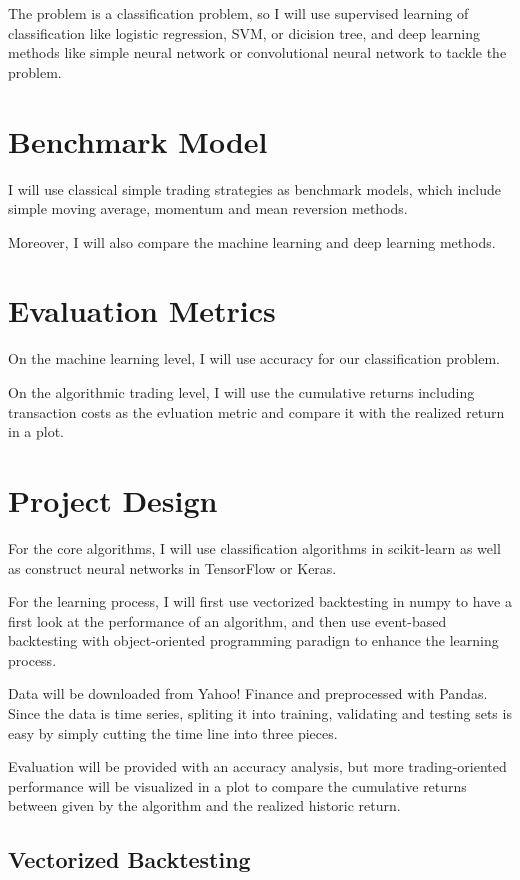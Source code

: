 \documentclass[11pt]{article} %
\begin{document}
The problem is a classification problem, so I will use supervised learning of classification like logistic regression, SVM, or dicision tree, and deep learning methods like simple neural network or convolutional neural network to tackle the problem.


\section{Benchmark Model}

I will use classical simple trading strategies as benchmark models, which include simple moving average, momentum and mean reversion methods. 

Moreover, I will also compare the machine learning and deep learning methods. 


\section{Evaluation Metrics}

On the machine learning level, I will use accuracy for our classification problem.

On the algorithmic trading level, I will use the cumulative returns including transaction costs as the evluation metric and compare it with the realized return in a plot.


\section{Project Design}

For the core algorithms, I will use classification algorithms in scikit-learn as well as construct neural networks in TensorFlow or Keras.

For the learning process, I will first use vectorized backtesting in numpy to have a first look at the performance of an algorithm, and then use event-based backtesting with object-oriented programming paradign to enhance the learning process.

Data will be downloaded from Yahoo! Finance and preprocessed with Pandas. Since the data is time series, spliting it into training, validating and testing sets is easy by simply cutting the time line into three pieces.

Evaluation will be provided with an accuracy analysis, but more trading-oriented performance will be visualized in a plot to compare the cumulative returns between given by the algorithm and the realized historic return.




\subsection{Vectorized Backtesting}
\end{document}
